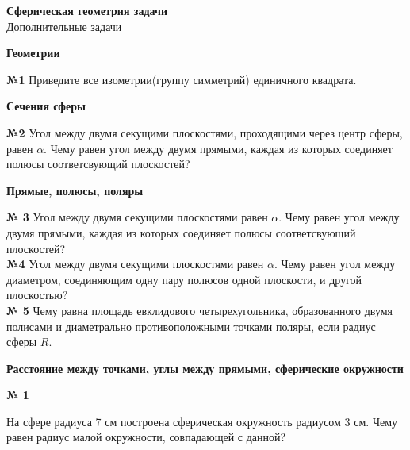 


    \begin{center}
        \textbf{Сферическая геометрия задачи}\\
        Дополнительные задачи
    \end{center}

    \begin{center}
       \textbf{Геометрии}
    \end{center}

    \textbf{№1}
    Приведите все изометрии(группу симметрий) единичного квадрата.\\


    \begin{center}
        \textbf{Сечения сферы}
    \end{center}

    \textbf{№2}
    Угол между двумя секущими плоскостями, проходящими через центр сферы, равен $\alpha$.
    Чему равен угол между двумя прямыми,
    каждая из которых соединяет полюсы соответсвующий плоскостей?\\


    \begin{center}
        \textbf{Прямые, полюсы, поляры}
    \end{center}

    \textbf{№ 3}
    Угол между двумя секущими плоскостями равен $\alpha$.
    Чему равен угол между двумя прямыми,
    каждая из которых соединяет полюсы соответсвующий плоскостей?\\


     \textbf{№4} Угол между двумя секущими плоскостями равен $\alpha$.
    Чему равен угол между диаметром, соединяющим одну пару полюсов одной плоскости, и другой плоскостью?\\


    \textbf{№ 5}
    Чему равна площадь евклидового четырехугольника, образованного двумя полисами и диаметрально противоположными точками поляры,
    если радиус сферы $R$.\\


    \begin{center}
        \textbf{Расстояние между точками, углы между прямыми, сферические окружности}
    \end{center}

    \begin{center}
        \textbf{№ 1}
    \end{center}

    На сфере радиуса 7 см построена сферическая окружность радиусом 3 см.
    Чему равен радиус малой окружности, совпадающей с данной?

